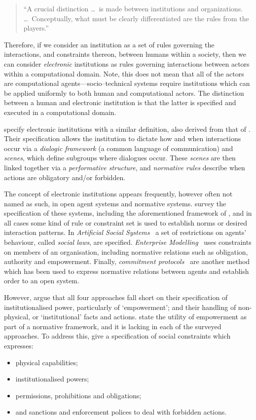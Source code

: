 \begin{quote}
``A crucial distinction \ldots\ is made between institutions and organizations.
\ldots\ Conceptually, what must be clearly differentiated are the rules from the
players.''~\citep[p.4]{North1990}
\end{quote}

Therefore, if we consider an institution as a set of rules governing the
interactions, and constraints thereon, between humans within a society, then
we can consider \emph{electronic} institutions as rules governing interactions
between actors within a computational domain. Note, this does not mean that all
of the actors are computational agents---socio--technical systems require
institutions which can be applied uniformly to both human and computational
actors. The distinction between a human and electronic institution is that the
latter is specified and executed in a computational domain.

\citet{Esteva2001} specify electronic institutions with a similar definition,
also derived from that of \citet{North1990}. Their specification allows
the institution to dictate how and when interactions occur via a
\emph{dialogic framework} (a common language of communication) and
\emph{scenes}, which define subgroups where dialogues occur. These
\emph{scenes} are then linked together via a \emph{performative structure},
and \emph{normative rules} describe when actions are obligatory and/or
forbidden.

The concept of electronic institutions appears frequently, however often not
named as such, in open agent systems and normative systems.
\citet{Artikis2009a} survey the specification of these systems, including the
aforementioned framework of \citet{Esteva2001}, and in all cases some kind of
rule or constraint set is used to establish norms or desired interaction
patterns. In \emph{Artificial Social Systems}~\citep{Moses1995} a set of
restrictions on agents' behaviour, called \emph{social laws}, are specified.
\emph{Enterprise Modelling}~\citep{Fox1995} uses constraints on members of an
organisation, including normative relations such as obligation, authority and
empowerment. Finally, \emph{commitment protocols}~\citep{Chopra2006} are another method which has
been used to express normative relations between agents and establish order to
an open system.

However, \citet{Artikis2009a} argue that all four approaches fall short on their
specification of institutionalised power, particularly of `empowerment'; and their
handling of non-physical, or `institutional' facts and actions. \citet{Jones1996}
state the utility of empowerment as part of a normative framework, and it is
lacking in each of the surveyed approaches. To address this, \citet{Artikis2009}
give a specification of social constraints which expresses: 
\begin{itemize}
\item physical capabilities;
\item institutionalised powers;
\item permissions, prohibitions and obligations; 
\item and sanctions and enforcement polices to deal with forbidden actions.
\end{itemize}

